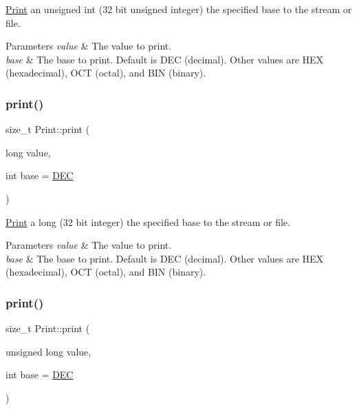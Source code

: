 \hyperlink{class_print}{Print} an unsigned int (32 bit unsigned integer) the specified base to the stream or file. 


\begin{DoxyParams}{Parameters}
{\em value} & The value to print. \\
\hline
{\em base} & The base to print. Default is D\+EC (decimal). Other values are H\+EX (hexadecimal), O\+CT (octal), and B\+IN (binary). \\
\hline
\end{DoxyParams}
\mbox{\label{class_print_a0c663ac015ebc037ea044ba2e2cf2947}} 
\subsubsection{\texorpdfstring{print()}{print()}\hspace{0.1cm}{\footnotesize\ttfamily [15/19]}}
{\footnotesize\ttfamily size\+\_\+t Print\+::print (\begin{DoxyParamCaption}\item[{long}]{value,  }\item[{int}]{base = {\ttfamily \hyperlink{docs_2src_2spark__wiring__print_8h_a26e216c38cffa0a9965fa7933ba558b1}{D\+EC}} }\end{DoxyParamCaption})}



\hyperlink{class_print}{Print} a long (32 bit integer) the specified base to the stream or file. 


\begin{DoxyParams}{Parameters}
{\em value} & The value to print. \\
\hline
{\em base} & The base to print. Default is D\+EC (decimal). Other values are H\+EX (hexadecimal), O\+CT (octal), and B\+IN (binary). \\
\hline
\end{DoxyParams}
\mbox{\label{class_print_acb8c6dcd4339b024436002aa9a6f4be2}} 
\subsubsection{\texorpdfstring{print()}{print()}\hspace{0.1cm}{\footnotesize\ttfamily [16/19]}}
{\footnotesize\ttfamily size\+\_\+t Print\+::print (\begin{DoxyParamCaption}\item[{unsigned long}]{value,  }\item[{int}]{base = {\ttfamily \hyperlink{docs_2src_2spark__wiring__print_8h_a26e216c38cffa0a9965fa7933ba558b1}{D\+EC}} }\end{DoxyParamCaption})}



